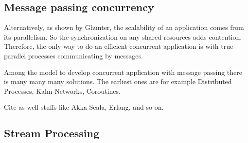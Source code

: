 









\subsection{Message passing concurrency} \label{chapter3:parallel-execution:message-passing}

Alternatively, as shown by Ghunter, the scalability of an application comes from its parallelism.
So the synchronization on any shared resources adds contention.
Therefore, the only way to do an efficient concurrent application is with true parallel processes communicating by messages.





Among the model to develop concurrent application with message passing there is many many many solutions.
The earliest ones are for example Distributed Processes, Kahn Networks, Coroutines.

Cite as well stuffs like Akka Scala, Erlang, and so on.

\subsection{Stream Processing} \label{chapter3:parallel-execution:stream-processing}

